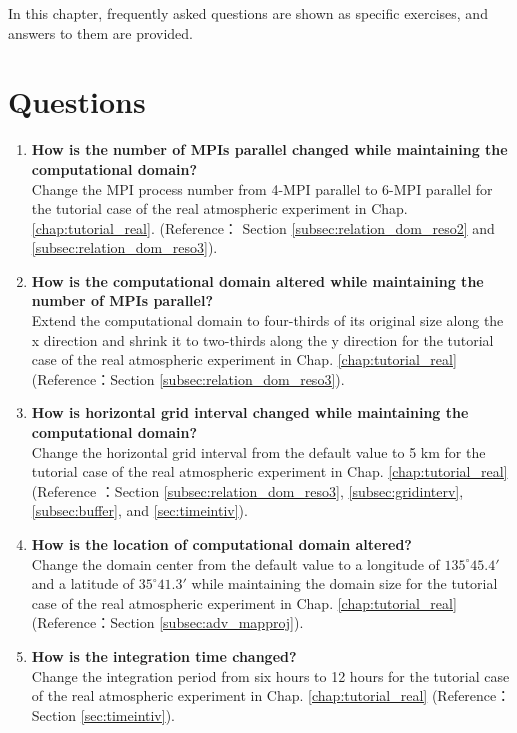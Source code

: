 
In this chapter, frequently asked questions are shown as specific exercises, and answers to them are provided. %

\section*{Questions}

\begin{enumerate}
\item {\bf How is the number of MPIs parallel changed while maintaining the computational domain?}\\
Change the MPI process number from 4-MPI parallel to 6-MPI parallel for the tutorial case of the real atmospheric experiment in Chap. \ref{chap:tutorial_real}.
(Reference： Section \ref{subsec:relation_dom_reso2} and \ref{subsec:relation_dom_reso3}).

\item {\bf How is the computational domain altered while maintaining the number of MPIs parallel?}\\
Extend the computational domain to four-thirds of its original size along the x direction and shrink it to two-thirds along the y direction for the tutorial case of the real atmospheric experiment in Chap. \ref{chap:tutorial_real} (Reference：Section \ref{subsec:relation_dom_reso3}).

\item {\bf How is horizontal grid interval changed while maintaining the computational domain?}\\ 
Change the horizontal grid interval from the default value to 5 km for the tutorial case of the real atmospheric experiment in Chap. \ref{chap:tutorial_real} (Reference ：Section \ref{subsec:relation_dom_reso3}, \ref{subsec:gridinterv}, \ref{subsec:buffer}, and \ref{sec:timeintiv}).

\item {\bf How is the location of computational domain altered?}\\
Change the domain center from the default value to a longitude of $135^\circ 45.4'$ and a latitude of $35^\circ 41.3'$ while maintaining the domain size for the tutorial case of the real atmospheric experiment in Chap. \ref{chap:tutorial_real} (Reference：Section \ref{subsec:adv_mapproj}).

\item {\bf How is the integration time changed?}\\
Change the integration period from six hours to 12 hours for the tutorial case of the real atmospheric experiment in Chap. \ref{chap:tutorial_real}
(Reference：Section \ref{sec:timeintiv}).


\end{enumerate}
